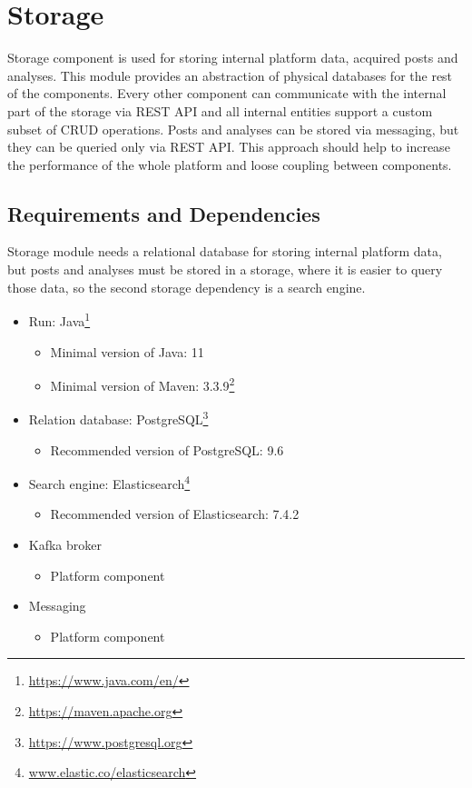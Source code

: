 
\section{Storage}\label{section:storage}

Storage component is used for storing internal platform data, acquired posts and analyses. This module provides an abstraction of physical databases for the rest of the components. Every other component can communicate with the internal part of the storage via REST API and all internal entities support a custom subset of CRUD operations. Posts and analyses can be stored via messaging, but they can be queried only via REST API. This approach should help to increase the performance of the whole platform and loose coupling between components.

\subsection{Requirements and Dependencies}

Storage module needs a relational database for storing internal platform data, but posts and analyses must be stored in a storage, where it is easier to query those data, so the second storage dependency is a search engine.

\begin{itemize}
    \item Run: Java\footnote{\url{https://www.java.com/en/}}
        \begin{itemize}
            \item Minimal version of Java: 11
            \item Minimal version of Maven: 3.3.9\footnote{\url{https://maven.apache.org}}
        \end{itemize}
    \item Relation database: PostgreSQL\footnote{\url{https://www.postgresql.org}}
        \begin{itemize}
            \item Recommended version of PostgreSQL: 9.6
        \end{itemize}
    \item Search engine: Elasticsearch\footnote{\url{www.elastic.co/elasticsearch}}
        \begin{itemize}
            \item Recommended version of Elasticsearch: 7.4.2
        \end{itemize}
    \item Kafka broker
        \begin{itemize}
            \item Platform component
        \end{itemize}
    \item Messaging
        \begin{itemize}
            \item Platform component
        \end{itemize}
\end{itemize}

